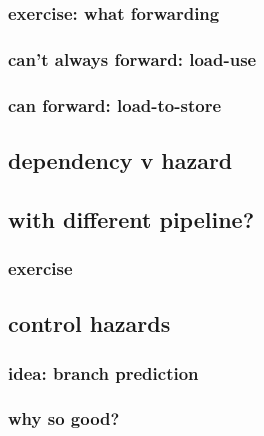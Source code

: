 \subsubsection{exercise: what forwarding}


\subsubsection{can't always forward: load-use}


\subsubsection{can forward: load-to-store}




\subsection{dependency v hazard}




\subsection{with different pipeline?}


\subsubsection{exercise}


\subsection{control hazards}

\subsubsection{idea: branch prediction}



\subsubsection{why so good?}


